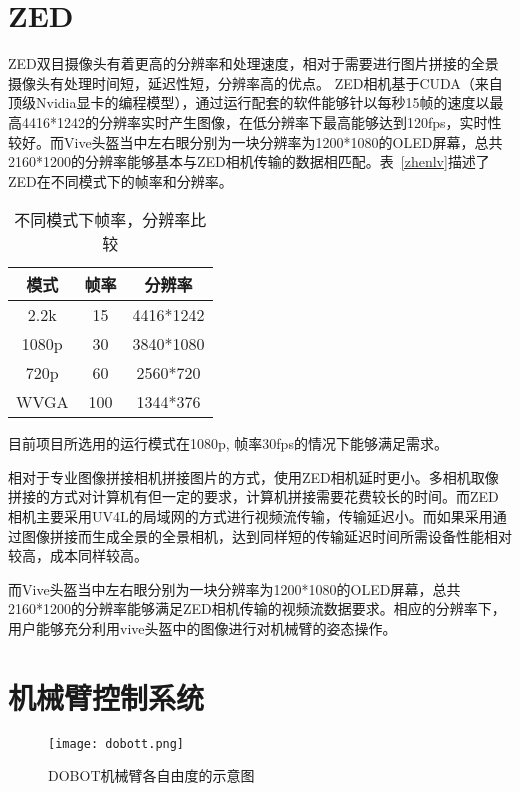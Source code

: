 \section{ZED}

ZED双目摄像头有着更高的分辨率和处理速度，相对于需要进行图片拼接的全景摄像头有处理时间短，延迟性短，分辨率高的优点。
ZED相机基于CUDA（来自顶级Nvidia显卡的编程模型），通过运行配套的软件能够针以每秒15帧的速度以最高4416*1242的分辨率实时产生图像，在低分辨率下最高能够达到120fps，实时性较好。而Vive头盔当中左右眼分别为一块分辨率为1200*1080的OLED屏幕，总共2160*1200的分辨率能够基本与ZED相机传输的数据相匹配。表~\ref{zhenlv}描述了ZED在不同模式下的帧率和分辨率。

\begin{table}[htbp]\label{zhenlv}
	\centering
	\caption{不同模式下帧率，分辨率比较}
	\begin{tabular}{ccc}
		\toprule
		模式    & 帧率    & 分辨率 \\
		\midrule
		2.2k  & 15    & 4416*1242 \\
		\midrule
		1080p & 30    & 3840*1080 \\
		\midrule
		720p  & 60    & 2560*720 \\
		\midrule
		WVGA  & 100   & 1344*376 \\
		\bottomrule
	\end{tabular}%
	\label{tab:addlabel}%
\end{table}%

目前项目所选用的运行模式在1080p, 帧率30fps的情况下能够满足需求。

相对于专业图像拼接相机拼接图片的方式，使用ZED相机延时更小。多相机取像拼接的方式对计算机有但一定的要求，计算机拼接需要花费较长的时间。而ZED相机主要采用UV4L的局域网的方式进行视频流传输，传输延迟小。而如果采用通过图像拼接而生成全景的全景相机，达到同样短的传输延迟时间所需设备性能相对较高，成本同样较高。

而Vive头盔当中左右眼分别为一块分辨率为1200*1080的OLED屏幕，总共2160*1200的分辨率能够满足ZED相机传输的视频流数据要求。相应的分辨率下，用户能够充分利用vive头盔中的图像进行对机械臂的姿态操作。


\section{机械臂控制系统}

\begin{figure}[htbp]
\small
\centering
\texttt{[image: dobott.png]}
\caption{DOBOT机械臂各自由度的示意图} 
\label{dobott}
\end{figure}

